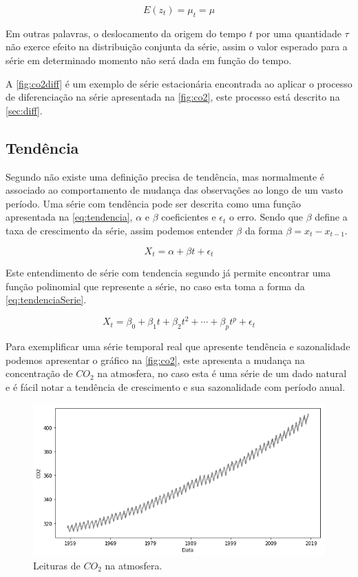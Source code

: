 \documentclass[
    12pt,
    oneside,
    a4paper,
    english,
    brazil
]{abntex2}
\begin{document}
\begin{equation}
    \label{eq:westacionaria}
    E(z_t) = \mu_t = \mu
\end{equation}

Em outras palavras, o deslocamento da origem do tempo $t$ por uma quantidade
$\tau$ não exerce efeito na distribuição conjunta da série, assim o valor
esperado para a série em determinado momento não será dada em função do tempo.

A \autoref{fig:co2diff} é um exemplo de série estacionária encontrada ao aplicar
o processo de diferenciação na série apresentada na \autoref{fig:co2}, este
processo está descrito na \autoref{sec:diff}.

\subsection{Tendência}

Segundo  não existe uma definição precisa de tendência, mas
normalmente é associado ao comportamento de mudança das observações ao longo de
um vasto período. Uma série com tendência pode ser descrita como uma função
apresentada na \autoref{eq:tendencia}, $\alpha$ e $\beta{}$ coeficientes e
$\epsilon{}_t$ o erro. Sendo que $\beta{}$ define a taxa de crescimento da
série, assim podemos entender $\beta$ da forma $\beta = x_t - x_{t-1}$.

\begin{equation}
    \label{eq:tendencia}
    X_t = \alpha + \beta{}t + \epsilon{}_t
\end{equation}

Este entendimento de série com tendencia segundo  já permite
encontrar uma função polinomial que represente a série, no caso esta toma a
forma da \autoref{eq:tendenciaSerie}.

\begin{equation}
    \label{eq:tendenciaSerie}
    X_t = \beta_0 + \beta_1t + \beta_2t^2 + \cdots + \beta_{p}t^p + \epsilon_t
\end{equation}

Para exemplificar uma série temporal real que apresente tendência e sazonalidade
podemos apresentar o gráfico na \autoref{fig:co2}, este apresenta a mudança na
concentração de $CO_2$ na atmosfera, no caso esta é uma série de um dado natural
e é fácil notar a tendência de crescimento e sua sazonalidade com período anual.

\begin{figure}
    \centering
    \caption{Leituras de $CO_2$ na atmosfera.}\label{fig:co2}
    \includegraphics[width=.6\linewidth]{images/co2.png}
\end{figure}
\end{document}
